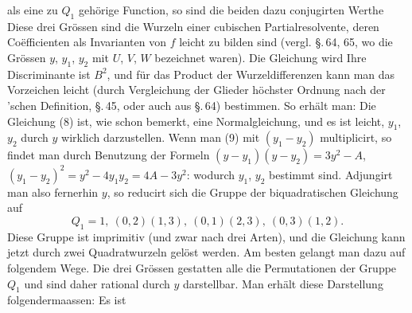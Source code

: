 als eine zu $Q_1$ gehörige Function, so sind die beiden dazu conjugirten Werthe
Diese drei Grössen sind die Wurzeln einer cubischen Partialresolvente, deren Coëfficienten als Invarianten von $f$ leicht zu bilden sind (vergl. \S.\,64, 65, wo die Grössen $y$, $y_1$, $y_2$ mit $U$, $V$, $W$ bezeichnet waren). Die Gleichung wird
Ihre Discriminante ist $B^2$, und für das Product der Wurzeldifferenzen kann man das Vorzeichen leicht (durch Vergleichung der Glieder höchster Ordnung nach der 'schen Definition, \S.\,45, oder auch aus \S.\,64) bestimmen. So erhält man:
Die Gleichung (8) ist, wie schon bemerkt, eine Normalgleichung, und es ist leicht, $y_1$, $y_2$ durch $y$ wirklich darzustellen. Wenn man (9) mit $(y_1-y_2)$ multiplicirt, so findet man durch Benutzung der Formeln $(y-y_1)(y-y_2) = 3y^2 - A$, $(y_1-y_2)^2 = y^2 - 4y_1y_2 = 4A - 3y^2$:
wodurch $y_1$, $y_2$ bestimmt sind. Adjungirt man also fernerhin $y$, so reducirt sich die Gruppe der biquadratischen Gleichung auf
\[
Q_1 = 1, \ (0,2)(1,3), \ (0,1)(2,3), \ (0,3)(1,2).
\]
Diese Gruppe ist imprimitiv (und zwar nach drei Arten), und die Gleichung kann jetzt durch zwei Quadratwurzeln gelöst werden. Am besten gelangt man dazu auf folgendem Wege. Die drei Grössen
gestatten alle die Permutationen der Gruppe $Q_1$ und sind daher rational durch $y$ darstellbar. Man erhält diese Darstellung folgendermaassen: Es ist
